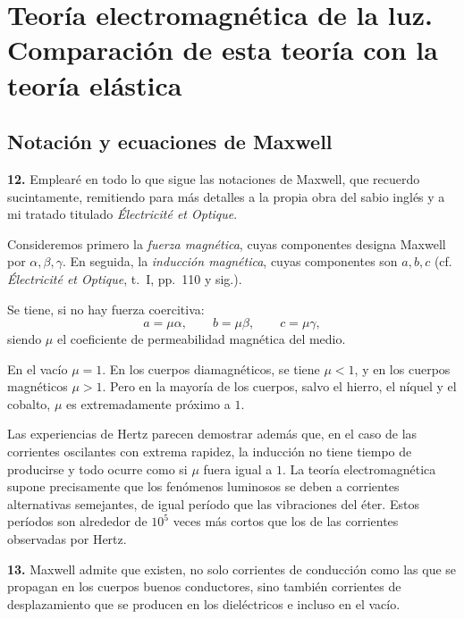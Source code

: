 \chapter{Teoría electromagnética de la luz. Comparación de esta teoría con
la teoría elástica}
\label{cap:vol2-electromagnetica}

\section{Notación y ecuaciones de Maxwell}

\noindent\textbf{12.} Emplearé en todo lo que sigue las notaciones de
Maxwell, que recuerdo sucintamente, remitiendo para más detalles a la
propia obra del sabio inglés y a mi tratado titulado \emph{Électricité et
Optique}.

Consideremos primero la \emph{fuerza magnética}, cuyas componentes designa
Maxwell por $\alpha,\beta,\gamma$. En seguida, la \emph{inducción
magnética}, cuyas componentes son $a,b,c$ (cf. \emph{Électricité et
Optique}, t.~I, pp.~110 y sig.).

Se tiene, si no hay fuerza coercitiva:
\[
a=\mu\alpha,\qquad b=\mu\beta,\qquad c=\mu\gamma,
\]
siendo $\mu$ el coeficiente de permeabilidad magnética del medio.

En el vacío $\mu=1$. En los cuerpos diamagnéticos, se tiene $\mu<1$, y en
los cuerpos magnéticos $\mu>1$. Pero en la mayoría de los cuerpos, salvo el
hierro, el níquel y el cobalto, $\mu$ es extremadamente próximo a $1$.

Las experiencias de Hertz parecen demostrar además que, en el caso de las
corrientes oscilantes con extrema rapidez, la inducción no tiene tiempo de
producirse y todo ocurre como si $\mu$ fuera igual a $1$. La teoría
electromagnética supone precisamente que los fenómenos luminosos se deben
a corrientes alternativas semejantes, de igual período que las vibraciones
del éter. Estos períodos son alrededor de $10^5$ veces más cortos que los
de las corrientes observadas por Hertz.

\noindent\textbf{13.} Maxwell admite que existen, no solo corrientes de
conducción como las que se propagan en los cuerpos buenos conductores,
sino también corrientes de desplazamiento que se producen en los
dieléctricos e incluso en el vacío.

